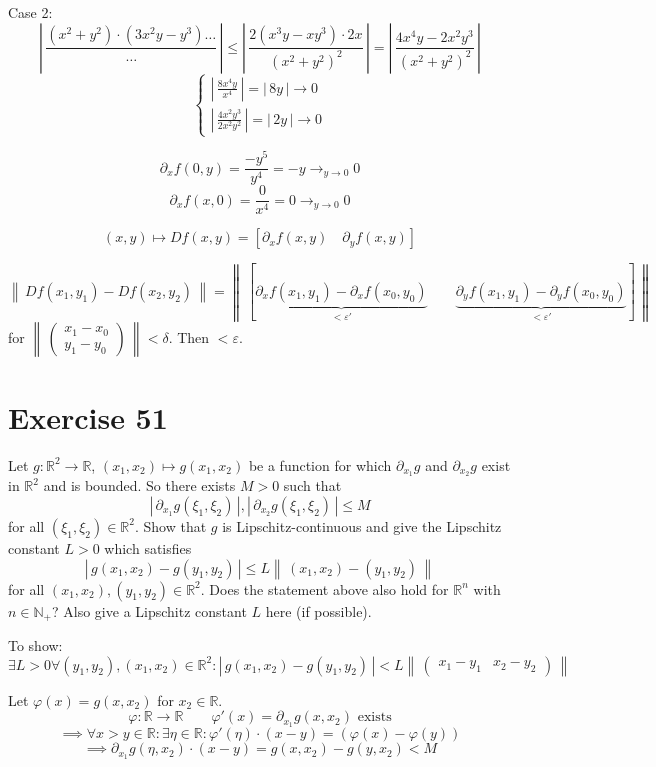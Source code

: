 \documentclass[a4paper]{article}
\theoremstyle{definition}
\newcommand\abs[1]{\left|\,#1\,\right|}
\newcommand\norm[1]{\left\|\,#1\,\right\|}
\begin{document}
Case 2:
\[
\abs{\frac{(x^2 + y^2) \cdot (3x^2y - y^3) \ldots}{\ldots}}
\leq \abs{\frac{2 (x^3 y - xy^3) \cdot 2x}{(x^2 + y^2)^2}}
= \abs{\frac{4x^4y - 2x^2 y^3}{(x^2 + y^2)^2}}
\] \[
\begin{cases}
  \abs{\frac{8x^4 y}{x^4}} = \abs{8y} \to 0 \\
  \abs{\frac{4x^2 y^3}{2x^2 y^2}} = \abs{2y} \to 0
\end{cases}
\]

\[ \partial_x f(0,y) = \frac{-y^5}{y^4} = -y \to_{y \to 0} 0 \]
\[ \partial_x f(x,0) = \frac{0}{x^4} = 0 \to_{y\to 0} 0 \]

\[ (x,y) \mapsto Df(x,y) = [\partial_x f(x,y) \quad \partial_y f(x,y)] \]

\[ \norm{Df(x_1, y_1) - Df(x_2, y_2)} = \norm{[\underbrace{\partial_x f(x_1, y_1) - \partial_x f(x_0, y_0)}_{<\varepsilon'} \qquad \underbrace{\partial_y f(x_1, y_1) - \partial_y f(x_0, y_0)}_{<\varepsilon'}]} \]
for $\norm{\begin{pmatrix} x_1 - x_0 \\ y_1 - y_0 \end{pmatrix}} < \delta$.
Then $<\varepsilon$.


\section{Exercise 51}
\begin{ex}
  Let $g: \mathbb R^2 \to \mathbb R$, $(x_1, x_2) \mapsto g(x_1, x_2)$ be a function for which $\partial_{x_1} g$ and $\partial_{x_2} g$
  exist in $\mathbb R^2$ and is bounded. So there exists $M > 0$ such that
  \[ \abs{\partial_{x_1} g(\xi_1, \xi_2)}, \abs{\partial_{x_2} g(\xi_1, \xi_2)} \leq M \]
  for all $(\xi_1, \xi_2) \in \mathbb R^2$. Show that $g$ is Lipschitz-continuous and
  give the Lipschitz constant $L > 0$ which satisfies
  \[ \abs{g(x_1, x_2) - g(y_1, y_2)} \leq L \norm{(x_1, x_2) - (y_1, y_2)} \]
  for all $(x_1, x_2), (y_1, y_2) \in \mathbb R^2$.
  Does the statement above also hold for $\mathbb R^n$ with $n \in \mathbb N_+$?
  Also give a Lipschitz constant $L$ here (if possible).
\end{ex}

To show:
\[
  \exists L > 0 \forall (y_1, y_2), (x_1, x_2) \in \mathbb R^2:
  \abs{g(x_1, x_2) - g(y_1, y_2)} < L \norm{\begin{pmatrix} x_1 - y_1 & x_2 - y_2 \end{pmatrix}}
\]

Let $\varphi(x) = g(x, x_2)$ for $x_2 \in \mathbb R$.
\[ \varphi: \mathbb R \to \mathbb R \qquad \varphi'(x) = \partial_{x_1} g(x, x_2) \text{ exists} \]
\[ \implies \forall x > y \in \mathbb R: \exists \eta \in \mathbb R: \varphi'(\eta) \cdot (x - y) = (\varphi(x) - \varphi(y)) \]
\[ \implies \partial_{x_1} g(\eta, x_2) \cdot (x - y) = g(x, x_2) - g(y, x_2) < M \]
\end{document}

